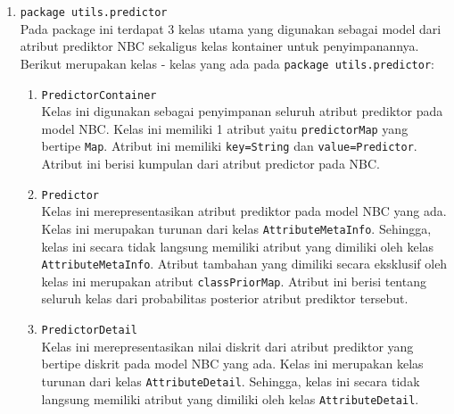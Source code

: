 \begin{enumerate}
\begin{enumerate}
	\end{enumerate}
	
	\item{\texttt{package utils.predictor}}\\
	Pada package ini terdapat 3 kelas utama yang digunakan sebagai model dari atribut prediktor NBC sekaligus kelas kontainer untuk penyimpanannya. Berikut merupakan kelas - kelas yang ada pada \texttt{package utils.predictor}:
	\begin{enumerate}
		\item \texttt{PredictorContainer}\\
		Kelas ini digunakan sebagai penyimpanan seluruh atribut prediktor pada model NBC. Kelas ini memiliki 1 atribut yaitu \texttt{predictorMap} yang bertipe \texttt{Map}. Atribut ini memiliki \texttt{key=String} dan \texttt{value=Predictor}. Atribut ini berisi kumpulan dari atribut predictor pada NBC.

		\item \texttt{Predictor}\\
		Kelas ini merepresentasikan atribut prediktor pada model NBC yang ada. Kelas ini merupakan turunan dari kelas \texttt{AttributeMetaInfo}. Sehingga, kelas ini secara tidak langsung memiliki atribut yang dimiliki oleh kelas \texttt{AttributeMetaInfo}. Atribut tambahan yang dimiliki secara eksklusif oleh kelas ini merupakan atribut \texttt{classPriorMap}. Atribut ini berisi tentang seluruh kelas dari probabilitas posterior atribut prediktor tersebut.

		\item \texttt{PredictorDetail}\\
		Kelas ini merepresentasikan nilai diskrit dari atribut prediktor yang bertipe diskrit pada model NBC yang ada. Kelas ini merupakan kelas turunan dari kelas \texttt{AttributeDetail}. Sehingga, kelas ini secara tidak langsung memiliki atribut yang dimiliki oleh kelas \texttt{AttributeDetail}.
	\end{enumerate}
	
\end{enumerate}


